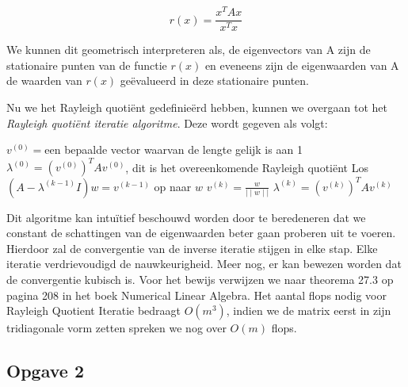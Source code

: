 \documentclass[a4paper, 12pt, titlepage]{report}
\begin{document}
\begin{equation}
	r(x) = \frac{x^TAx}{x^Tx}
\end{equation}

We kunnen dit geometrisch interpreteren als, de eigenvectors van A zijn de stationaire punten van de functie $r(x)$ en eveneens zijn de eigenwaarden van A de waarden van $r(x)$ ge\"evalueerd in deze stationaire punten.

Nu we het Rayleigh quoti\"ent gedefinie\"erd hebben, kunnen we overgaan tot het \emph{Rayleigh quoti\"ent iteratie algoritme}. Deze wordt gegeven als volgt:\\

\begin{algorithmic}
 \STATE $v^{(0)} = $een bepaalde vector waarvan de lengte gelijk is aan 1
 \STATE $\lambda^{(0)} = (v^{(0)})^TAv^{(0)}$, dit is het overeenkomende Rayleigh quoti\"ent
 	\STATE Los $(A-\lambda^{(k-1)}I)w = v^{(k-1)}$ op naar $w$
 	\STATE $v^{(k)} = \frac{w}{\mid \mid w \mid \mid}$
 	\STATE $\lambda^{(k)}=(v^{(k)})^TAv^{(k)}$
 \ENDFOR
\end{algorithmic}

Dit algoritme kan intu\"itief beschouwd worden door te beredeneren dat we constant de schattingen van de eigenwaarden beter gaan proberen uit te voeren. Hierdoor zal de convergentie van de inverse iteratie stijgen in elke stap. Elke iteratie verdrievoudigd de nauwkeurigheid. Meer nog, er kan bewezen worden dat de convergentie kubisch is. Voor het bewijs verwijzen we naar theorema 27.3 op pagina 208 in het boek Numerical Linear Algebra. Het aantal flops nodig voor Rayleigh Quotient Iteratie bedraagt $O(m^3)$, indien we de matrix eerst in zijn tridiagonale vorm zetten spreken we nog over $O(m)$ flops.


\subsection{Opgave 2}
\end{document}
